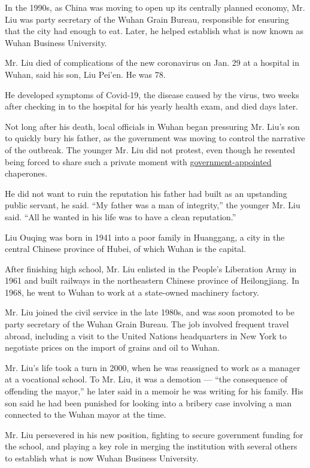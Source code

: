 In the 1990s, as China was moving to open up its centrally planned
economy, Mr. Liu was party secretary of the Wuhan Grain Bureau,
responsible for ensuring that the city had enough to eat. Later, he
helped establish what is now known as Wuhan Business University.

Mr. Liu died of complications of the new coronavirus on Jan. 29 at a
hospital in Wuhan, said his son, Liu Pei'en. He was 78.

He developed symptoms of Covid-19, the disease caused by the virus, two
weeks after checking in to the hospital for his yearly health exam, and
died days later.

Not long after his death, local officials in Wuhan began pressuring Mr.
Liu's son to quickly bury his father, as the government was moving to
control the narrative of the outbreak. The younger Mr. Liu did not
protest, even though he resented being forced to share such a private
moment with
\href{https://www.nytimes3xbfgragh.onion/2020/04/03/world/asia/coronavirus-china-grief-deaths.html}{government-appointed}
chaperones.

He did not want to ruin the reputation his father had built as an
upstanding public servant, he said. ``My father was a man of
integrity,'' the younger Mr. Liu said. ``All he wanted in his life was
to have a clean reputation.''

Liu Ouqing was born in 1941 into a poor family in Huanggang, a city in
the central Chinese province of Hubei, of which Wuhan is the capital.

After finishing high school, Mr. Liu enlisted in the People's Liberation
Army in 1961 and built railways in the northeastern Chinese province of
Heilongjiang. In 1968, he went to Wuhan to work at a state-owned
machinery factory.

Mr. Liu joined the civil service in the late 1980s, and was soon
promoted to be party secretary of the Wuhan Grain Bureau. The job
involved frequent travel abroad, including a visit to the United Nations
headquarters in New York to negotiate prices on the import of grains and
oil to Wuhan.

Mr. Liu's life took a turn in 2000, when he was reassigned to work as a
manager at a vocational school. To Mr. Liu, it was a demotion --- ``the
consequence of offending the mayor,'' he later said in a memoir he was
writing for his family. His son said he had been punished for looking
into a bribery case involving a man connected to the Wuhan mayor at the
time.

Mr. Liu persevered in his new position, fighting to secure government
funding for the school, and playing a key role in merging the
institution with several others to establish what is now Wuhan Business
University.


